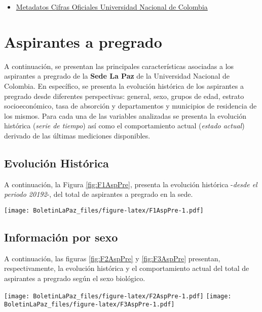 \documentclass[
]{book}
\providecommand{\tightlist}{%
  \setlength{\itemsep}{0pt}\setlength{\parskip}{0pt}}
\begin{document}
\begin{itemize}
\tightlist
\item
  \href{http://estadisticas.unal.edu.co/menu-principal/cifras-generales/metadatos/cifras-generales/}{Metadatos Cifras Oficiales Universidad Nacional de Colombia}
\end{itemize}

\hypertarget{AspPre}{%
\section{Aspirantes a pregrado}\label{AspPre}}

A continuación, se presentan las principales características asociadas a los aspirantes a pregrado de la \textbf{Sede La Paz} de la Universidad Nacional de Colombia. En específico, se presenta la evolución histórica de los aspirantes a pregrado desde diferentes perspectivas: general, sexo, grupos de edad, estrato socioeconómico, tasa de absorción y departamentos y municipios de residencia de los mismos. Para cada una de las variables analizadas se presenta la evolución histórica (\emph{serie de tiempo}) así como el comportamiento actual (\emph{estado actual}) derivado de las últimas mediciones disponibles.

\hypertarget{evoluciuxf3n-histuxf3rica}{%
\subsection{Evolución Histórica}\label{evoluciuxf3n-histuxf3rica}}

A continuación, la Figura \ref{fig:F1AspPre}, presenta la evolución histórica -\emph{desde el periodo 20192}-, del total de aspirantes a pregrado en la sede.

\texttt{[image: BoletinLaPaz\_files/figure-latex/F1AspPre-1.pdf]}

\hypertarget{informaciuxf3n-por-sexo}{%
\subsection{Información por sexo}\label{informaciuxf3n-por-sexo}}

A continuación, las figuras \ref{fig:F2AspPre} y \ref{fig:F3AspPre} presentan, respectivamente, la evolución histórica y el comportamiento actual del total de aspirantes a pregrado según el sexo biológico.

\texttt{[image: BoletinLaPaz\_files/figure-latex/F2AspPre-1.pdf]}
\texttt{[image: BoletinLaPaz\_files/figure-latex/F3AspPre-1.pdf]}
\end{document}
